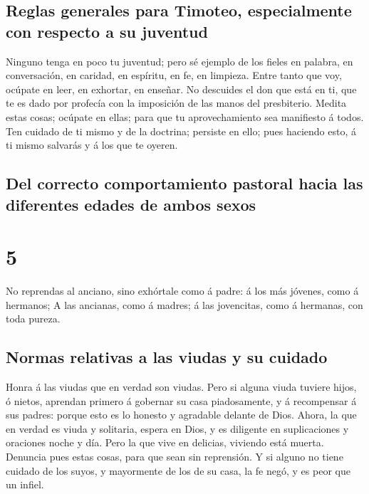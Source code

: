 \hypertarget{reglas-generales-para-timoteo-especialmente-con-respecto-a-su-juventud}{%
\subsection{Reglas generales para Timoteo, especialmente con respecto a
su
juventud}\label{reglas-generales-para-timoteo-especialmente-con-respecto-a-su-juventud}}

 Ninguno tenga en poco tu juventud; pero sé ejemplo de
los fieles en palabra, en conversación, en caridad, en espíritu, en fe,
en limpieza.  Entre tanto que voy, ocúpate en leer, en
exhortar, en enseñar.  No descuides el don que está en
ti, que te es dado por profecía con la imposición de las manos del
presbiterio.  Medita estas cosas; ocúpate en ellas; para
que tu aprovechamiento sea manifiesto á todos.  Ten
cuidado de ti mismo y de la doctrina; persiste en ello; pues haciendo
esto, á ti mismo salvarás y á los que te oyeren.

\hypertarget{del-correcto-comportamiento-pastoral-hacia-las-diferentes-edades-de-ambos-sexos}{%
\subsection{Del correcto comportamiento pastoral hacia las diferentes
edades de ambos
sexos}\label{del-correcto-comportamiento-pastoral-hacia-las-diferentes-edades-de-ambos-sexos}}

\hypertarget{section-4}{%
\section{5}\label{section-4}}

 No reprendas al anciano, sino exhórtale como á padre: á
los más jóvenes, como á hermanos;  A las ancianas, como á
madres; á las jovencitas, como á hermanas, con toda pureza.

\hypertarget{normas-relativas-a-las-viudas-y-su-cuidado}{%
\subsection{Normas relativas a las viudas y su
cuidado}\label{normas-relativas-a-las-viudas-y-su-cuidado}}

 Honra á las viudas que en verdad son viudas.
 Pero si alguna viuda tuviere hijos, ó nietos, aprendan
primero á gobernar su casa piadosamente, y á recompensar á sus padres:
porque esto es lo honesto y agradable delante de Dios. 
Ahora, la que en verdad es viuda y solitaria, espera en Dios, y es
diligente en suplicaciones y oraciones noche y día.  Pero
la que vive en delicias, viviendo está muerta.  Denuncia
pues estas cosas, para que sean sin reprensión.  Y si
alguno no tiene cuidado de los suyos, y mayormente de los de su casa, la
fe negó, y es peor que un infiel.

